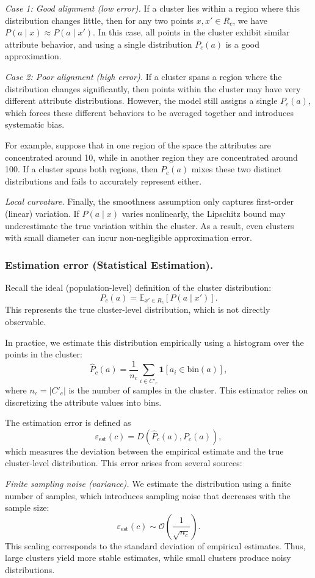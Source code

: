 \textit{Case 1: Good alignment (low error).}
If a cluster lies within a region where this distribution changes little, then
for any two points \(x, x' \in R_c\), we have \(P(a \mid x) \approx P(a \mid x')\).
In this case, all points in the cluster exhibit similar attribute behavior, and
using a single distribution \(P_c(a)\) is a good approximation.

\textit{Case 2: Poor alignment (high error).}
If a cluster spans a region where the distribution changes significantly, then
points within the cluster may have very different attribute distributions.
However, the model still assigns a single \(P_c(a)\), which forces these
different behaviors to be averaged together and introduces systematic bias.

For example, suppose that in one region of the space the attributes are
concentrated around 10, while in another region they are concentrated around
100. If a cluster spans both regions, then \(P_c(a)\) mixes these two distinct
distributions and fails to accurately represent either.

\emph{Local curvature.}
Finally, the smoothness assumption only captures first-order (linear) variation.
If \(P(a \mid x)\) varies nonlinearly, the Lipschitz bound may underestimate the
true variation within the cluster. As a result, even clusters with small
diameter can incur non-negligible approximation error.

\subsubsection{Estimation error (Statistical Estimation).}
Recall the ideal (population-level) definition of the cluster distribution:
\[
P_c(a) = \mathbb{E}_{x' \in R_c}[P(a \mid x')].
\]
This represents the true cluster-level distribution, which is not directly
observable.

In practice, we estimate this distribution empirically using a histogram over
the points in the cluster:
\[
\hat{P}_c(a) = \frac{1}{n_c} \sum_{i \in C'_c} \mathbf{1}[a_i \in \text{bin}(a)],
\]
where \(n_c = |C'_c|\) is the number of samples in the cluster. This estimator
relies on discretizing the attribute values into bins.

The estimation error is defined as
\[
\varepsilon_{\mathrm{est}}(c)
=
D(\hat{P}_c(a), P_c(a)),
\]
which measures the deviation between the empirical estimate and the true
cluster-level distribution. This error arises from several sources:

\emph{Finite sampling noise (variance).}
We estimate the distribution using a finite number of samples, which introduces
sampling noise that decreases with the sample size:
\[
\varepsilon_{\mathrm{est}}(c) \sim \mathcal{O}\!\left(\frac{1}{\sqrt{n_c}}\right).
\]
This scaling corresponds to the standard deviation of empirical estimates. Thus, large clusters yield more
stable estimates, while small clusters produce noisy distributions.

